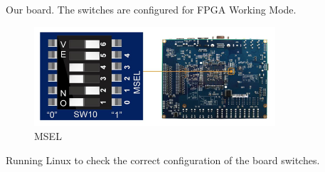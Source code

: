 \clearpage
\newpage

Our board. The switches are configured for FPGA Working Mode.
\begin{figure}[h]
	\centering		\includegraphics[width=0.8\textwidth]{img/ciclonv3}
	\caption{MSEL}
    	\label{fig:ciclonv3}
\end{figure}


Running Linux to check the correct configuration of the board switches.
